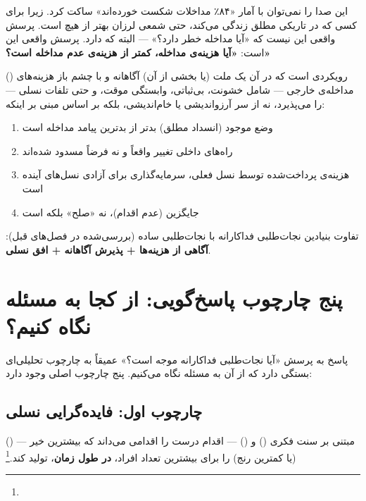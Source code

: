 این صدا را نمی‌توان با آمار «۸۴٪ مداخلات شکست خورده‌اند» ساکت کرد. زیرا برای کسی که در تاریکی مطلق زندگی می‌کند، حتی شمعی لرزان بهتر از هیچ است. پرسش واقعی این نیست که «آیا مداخله خطر دارد؟» — البته که دارد. پرسش واقعی این است: \textbf{«آیا هزینه‌ی مداخله، کمتر از هزینه‌ی عدم مداخله است؟»}

\begin{tcolorbox}[defbox, title={مفهوم کلیدی: نجات‌طلبی فداکارانه}]
 () رویکردی است که در آن یک ملت (یا بخشی از آن) آگاهانه و با چشم باز هزینه‌های مداخله‌ی خارجی — شامل خشونت، بی‌ثباتی، وابستگی موقت، و حتی تلفات نسلی — را می‌پذیرد، نه از سر آرزواندیشی یا خام‌اندیشی، بلکه بر اساس  مبنی بر اینکه:
\begin{enumerate}
\item وضع موجود (انسداد مطلق) بدتر از بدترین پیامد مداخله است
\item راه‌های داخلی تغییر واقعاً و نه فرضاً مسدود شده‌اند
\item هزینه‌ی پرداخت‌شده توسط نسل فعلی، سرمایه‌گذاری برای آزادی نسل‌های آینده است
\item جایگزین (عدم اقدام)، نه «صلح» بلکه  است
\end{enumerate}
تفاوت بنیادین نجات‌طلبی فداکارانه با نجات‌طلبی ساده (بررسی‌شده در فصل‌های قبل): \textbf{آگاهی از هزینه‌ها + پذیرش آگاهانه + افق نسلی}.
\end{tcolorbox}


\section{پنج چارچوب پاسخ‌گویی: از کجا به مسئله نگاه کنیم؟}
\label{sec:ch15-frameworks}

پاسخ به پرسش «آیا نجات‌طلبی فداکارانه موجه است؟» عمیقاً به چارچوب تحلیلی‌ای بستگی دارد که از آن به مسئله نگاه می‌کنیم. پنج چارچوب اصلی وجود دارد:

\subsection{چارچوب اول: فایده‌گرایی نسلی}
\label{subsec:ch15-utilitarianism}

 () — مبتنی بر سنت فکری  () و  () — اقدام درست را اقدامی می‌داند که بیشترین خیر (یا کمترین رنج) را برای بیشترین تعداد افراد، \textbf{در طول زمان}، تولید کند.\footnote{}

